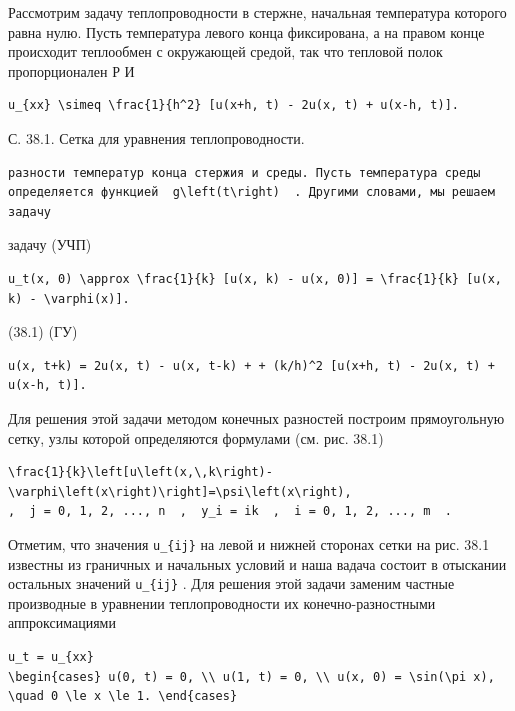 \documentclass[
  ukrainian,
]{article}
\begin{document}
Рассмотрим задачу теплопроводности в стержне, начальная температура
которого равна нулю. Пусть температура левого конца фиксирована, а на
правом конце происходит теплообмен с окружающей средой, так что тепловой
полок пропорционален Р И

\begin{verbatim}
u_{xx} \simeq \frac{1}{h^2} [u(x+h, t) - 2u(x, t) + u(x-h, t)].
\end{verbatim}

С. 38.1. Сетка для уравнения теплопроводности.

\begin{verbatim}
разности температур конца стержия и среды. Пусть температура среды определяется функцией  g\left(t\right)  . Другими словами, мы решаем задачу
\end{verbatim}

задачу (УЧП)

\begin{verbatim}
u_t(x, 0) \approx \frac{1}{k} [u(x, k) - u(x, 0)] = \frac{1}{k} [u(x, k) - \varphi(x)].
\end{verbatim}

(38.1) (ГУ)

\begin{verbatim}
u(x, t+k) = 2u(x, t) - u(x, t-k) + + (k/h)^2 [u(x+h, t) - 2u(x, t) + u(x-h, t)].
\end{verbatim}

Для решения этой задачи методом конечных разностей построим
прямоугольную сетку, узлы которой определяются формулами (см. рис. 38.1)

\begin{verbatim}
\frac{1}{k}\left[u\left(x,\,k\right)-\varphi\left(x\right)\right]=\psi\left(x\right),
,  j = 0, 1, 2, ..., n  ,  y_i = ik  ,  i = 0, 1, 2, ..., m  .
\end{verbatim}

Отметим, что значения \texttt{u\_\{ij\}} на левой и нижней сторонах
сетки на рис. 38.1 известны из граничных и начальных условий и наша
вадача состоит в отыскании остальных значений \texttt{u\_\{ij\}} . Для
решения этой задачи заменим частные производные в уравнении
теплопроводности их конечно-разностными аппроксимациями

\begin{verbatim}
u_t = u_{xx}
\begin{cases} u(0, t) = 0, \\ u(1, t) = 0, \\ u(x, 0) = \sin(\pi x), \quad 0 \le x \le 1. \end{cases}
\end{verbatim}
\end{document}
